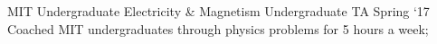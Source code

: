 \experience
    {MIT Undergraduate Electricity \& Magnetism}
    {Undergraduate TA}
    {Spring `17}
    {
        Coached MIT undergraduates through physics problems for 5 hours a week;
    }

